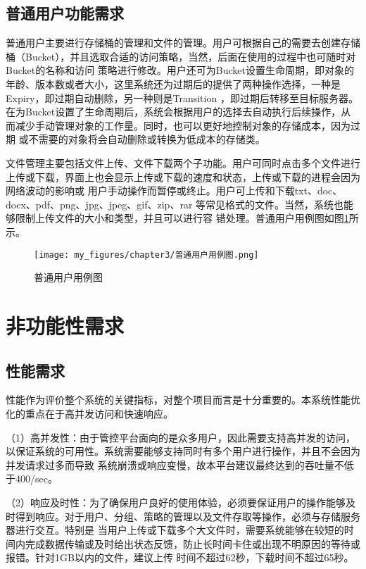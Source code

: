 \subsection{普通用户功能需求}

普通用户主要进行存储桶的管理和文件的管理。用户可根据自己的需要去创建存储桶（Bucket），并且选取合适的访问策略，当然，后面在使用的过程中也可随时对Bucket的名称和访问
策略进行修改。用户还可为Bucket设置生命周期，即对象的年龄、版本数或者大小，这里系统还为过期后的提供了两种操作选择，一种是Expiry，即过期自动删除，另一种则是Transition
，即过期后转移至目标服务器\cite{ko23i}。在为Bucket设置了生命周期后，系统会根据用户的选择去自动执行后续操作\cite{koyeji}，从而减少手动管理对象的工作量。同时，也可以更好地控制对象的存储成本，因为过期
或不需要的对象将会自动删除或转换为低成本的存储类。

文件管理主要包括文件上传、文件下载两个子功能。用户可同时点击多个文件进行上传或下载，界面上也会显示上传或下载的速度和状态，上传或下载的进程会因为网络波动的影响或
用户手动操作而暂停或终止。用户可上传和下载txt、doc、docx、pdf、png、jpg、jpeg、gif、zip、rar 
等常见格式的文件。当然，系统也能够限制上传文件的大小和类型，并且可以进行容
错处理。普通用户用例图如图\ref{fig:普通用户用例图}所示。

\begin{figure}[h]
    \centering
    \texttt{[image: my\_figures/chapter3/普通用户用例图.png]}
    \caption{普通用户用例图} 
    \label{fig:普通用户用例图}

\end{figure}

\section{非功能性需求}

\subsection{性能需求}

性能作为评价整个系统的关键指标，对整个项目而言是十分重要的。本系统性能优化的重点在于高并发访问和快速响应。

（1）高并发性：由于管控平台面向的是众多用户，因此需要支持高并发的访问，以保证系统的可用性。系统需要能够支持同时有多个用户进行操作，并且不会因为并发请求过多而导致
系统崩溃或响应变慢，故本平台建议最终达到的吞吐量不低于400/sec。

（2）响应及时性：为了确保用户良好的使用体验，必须要保证用户的操作能够及时得到响应。对于用户、分组、策略的管理以及文件存取等操作，必须与存储服务器进行交互。特别是
当用户上传或下载多个大文件时，需要系统能够在较短的时间内完成数据传输或及时给出状态反馈，防止长时间卡住或出现不明原因的等待或报错。针对1GB以内的文件，建议上传
时间不超过62秒，下载时间不超过65秒。

